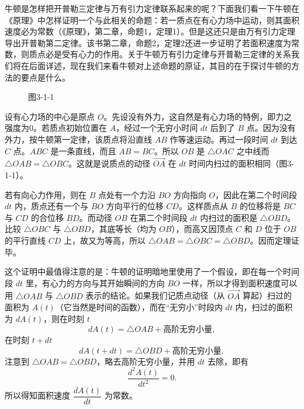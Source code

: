 牛顿是怎样把开普勒三定律与万有引力定律联系起来的呢？下面我们看一下牛顿在《原理》中怎样证明一个与此相关的命题：若一质点在有心力场中运动，则其面积速度必为常数（《原理》，第二章，命题1，定理1）。但是这还只是由万有引力定理导出开普勒第二定律。该书第二章，命题2，定理2还进一步证明了若面积速度为常数，则质点必是受有心力的作用。关于牛顿万有引力定律与开普勒三定律的关系我们将在后面详述，现在我们来看牛顿对上述命题的原证，其目的在于探讨牛顿的方法的要点是什么。

\begin{figure}[htbp]
\centering
{}
\caption*{图3-1-1}
\end{figure}

设有心力场的中心是原点 $O$。先设没有外力，这自然是有心力场的特例，即力之强度为0。若质点初始位置在 $A$，经过一个无穷小时间 $dt$ 后到了 $B$ 点。因为没有外力，按牛顿第一定律，该质点将沿直线 $AB$ 作等速运动。再过一段时间 $dt$ 到达 $C$ 点。$ABC$ 是一条直线，而且 $AB=BC$。所以 $OB$ 是 $\triangle OAC$ 之中线而 $\triangle OAB=\triangle OBC$。这就是说质点的动径 $\overrightarrow{OA}$ 在 $dt$ 时间内扫过的面积相同（图3-1-1）。

若有向心力作用，则在 $B$ 点处有一个力沿 $BO$ 方向指向 $O$，因此在第二个时间段 $dt$ 内，质点还有一个与 $BO$ 方向平行的位移 $CD$。这样质点从 $B$ 的位移将是 $BC$ 与 $CD$ 的合位移 $BD$。而动径 $OB$ 在第二个时间段 $dt$ 内扫过的面积是 $\triangle OBD$。比较 $\triangle OBC$ 与 $\triangle OBD$，其底等长（均为 $OB$），而高又因顶点 $C$ 和 $D$ 位于 $OB$ 的平行直线 $CD$ 上，故又为等高，所以 $\triangle OAB=\triangle OBC=\triangle OBD$。因而定理证毕。

这个证明中最值得注意的是：牛顿的证明暗地里使用了一个假设，即在每一个时间段 $dt$ 里，有心力的方向与其开始瞬间的方向 $BO$ 一样，所以才得到面积速度可以用 $\triangle OAB$ 与 $\triangle OBD$ 表示的结论。如果我们记质点动径（从 $\overrightarrow{OA}$ 算起）扫过的面积为 $A(t)$（它当然是时间的函数），而在“无穷小”时段内 $dt$ 内，扫过的面积为 $dA(t)$，则在时刻 $t$
\[
dA(t)=\triangle OAB+\text{高阶无穷小量},
\]
在时刻 $t+dt$
\[
dA(t+dt)=\triangle OBD+\text{高阶无穷小量},
\]
注意到 $\triangle OAB=\triangle OBD$，略去高阶无穷小量，并用 $dt$ 去除，即有
\[
\frac{d^2A(t)}{dt^2}=0.
\]
所以得知面积速度 $\dfrac{dA(t)}{dt}$ 为常数。

